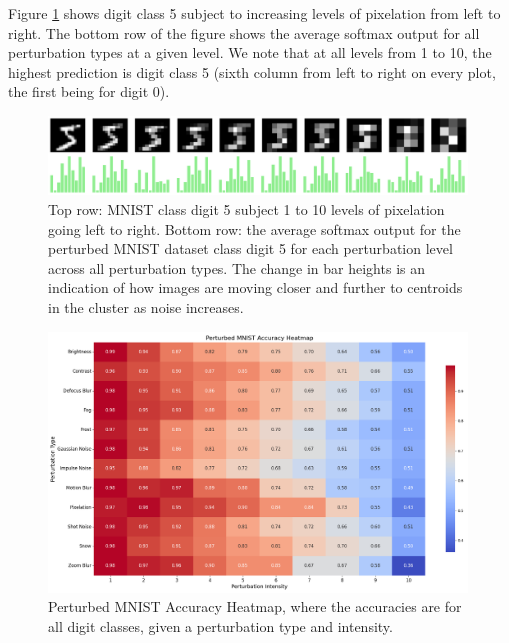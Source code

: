 Figure \ref{fig:Pixelation_Digit_5_images_histogramsx10_plus_softmax} shows digit class 5 subject to increasing levels of pixelation from left to right. The bottom row of the figure shows the average softmax output for all perturbation types at a given level. We note that at all levels from 1 to 10, the highest prediction is digit class 5 (sixth column from left to right on every plot, the first being for digit 0).
\begin{figure}[h!]
    \centering
    \includegraphics[width=0.99\textwidth]{Figures/Pixelation_Digit_5_images_histogramsx10_plus_softmax.png}   %
    \caption{Top row: MNIST class digit 5 subject 1 to 10 levels of pixelation going left to right. Bottom row: the average softmax output for the perturbed MNIST dataset class digit 5 for each perturbation level across all perturbation types. The change in bar heights is an indication of how images are moving closer and further to centroids in the cluster as noise increases.}\label{fig:Pixelation_Digit_5_images_histogramsx10_plus_softmax}
\end{figure}



\begin{figure}[h!]
    \centering
    \includegraphics[width=0.99\textwidth]{Figures/PerturbedMNISTAccuracyHeatmap.png}   %
    \caption{Perturbed MNIST Accuracy Heatmap, where the accuracies are for all digit classes, given a perturbation type and intensity.}
    \label{fig:PerturbedMNISTAccuracyHeatmap}
\end{figure}



